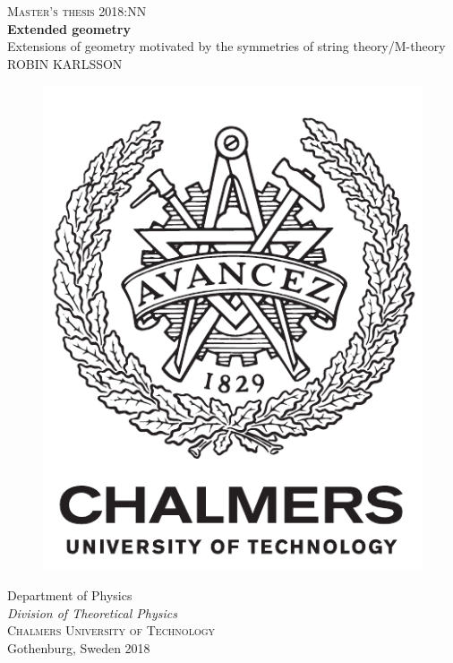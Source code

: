 \newpage
\thispagestyle{empty}
\begin{center}
	\textsc{\large Master's thesis 2018:NN}\\[4cm]		%
	\textbf{{\Huge 	Extended geometry}} 	\\[1cm]
	{\large Extensions of geometry motivated by the symmetries of string theory/M-theory}\\[1cm]
	{\large ROBIN KARLSSON}
	
	\vfill	
	\begin{figure}[H]
	\centering
	\includegraphics[width=0.2\pdfpagewidth]{figure/auxiliary/logo_eng.pdf} \\	
	\end{figure}	\vspace{5mm}	
	
	Department of Physics \\
	\emph{Division of Theoretical Physics}\\
	\textsc{Chalmers University of Technology} \\
	Gothenburg, Sweden 2018 \\
\end{center}


